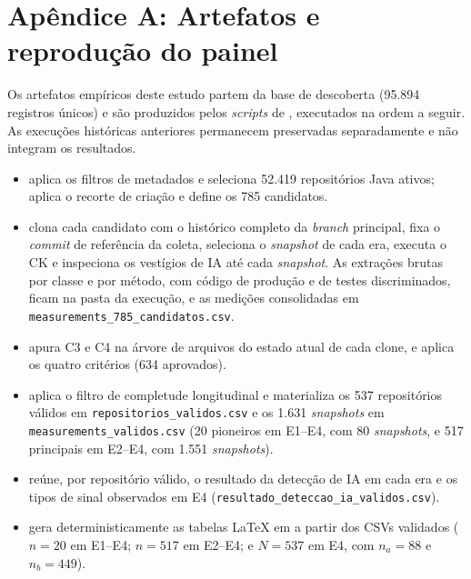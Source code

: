 \section*{Apêndice A: Artefatos e reprodução do painel}

Os artefatos empíricos deste estudo partem da base de descoberta  (95.894 registros únicos) e são produzidos pelos \emph{scripts} de , executados na ordem a seguir. As execuções históricas anteriores permanecem preservadas separadamente e não integram os resultados.

\begin{itemize}
    \item {} aplica os filtros de metadados e seleciona 52.419 repositórios Java ativos;  aplica o recorte de criação e define os 785 candidatos.
    \item {} clona cada candidato com o histórico completo da \emph{branch} principal, fixa o \emph{commit} de referência da coleta, seleciona o \emph{snapshot} de cada era, executa o CK e inspeciona os vestígios de IA até cada \emph{snapshot}. As extrações brutas por classe e por método, com código de produção e de testes discriminados, ficam na pasta da execução, e as medições consolidadas em \texttt{measurements\_785\_candidatos.csv}.
    \item {} apura C3 e C4 na árvore de arquivos do estado atual de cada clone, e  aplica os quatro critérios (634 aprovados).
    \item {} aplica o filtro de completude longitudinal e materializa os 537 repositórios válidos em \texttt{repositorios\_validos.csv} e os 1.631 \emph{snapshots} em \texttt{measurements\_validos.csv} (20 pioneiros em E1--E4, com 80 \emph{snapshots}, e 517 principais em E2--E4, com 1.551 \emph{snapshots}).
    \item {} reúne, por repositório válido, o resultado da detecção de IA em cada era e os tipos de sinal observados em E4 (\texttt{resultado\_deteccao\_ia\_validos.csv}).
    \item {} gera deterministicamente as tabelas LaTeX em  a partir dos CSVs validados ($n = 20$ em E1--E4; $n = 517$ em E2--E4; e $N = 537$ em E4, com $n_a = 88$ e $n_b = 449$).
\end{itemize}

